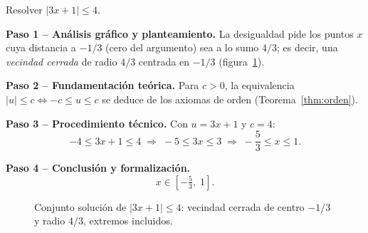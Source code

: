 \begin{example} Resolver $|3x + 1| \leq 4$.

\begin{myproof}
\textbf{Paso 1 – Análisis gráfico y planteamiento.}
La desigualdad pide los puntos $x$ cuya distancia a $-1/3$ (cero del argumento)
sea a lo sumo $4/3$; es decir, una \emph{vecindad cerrada} de radio $4/3$
centrada en $-1/3$ (figura~\ref{fig:valabs_desigualdad}).

\textbf{Paso 2 – Fundamentación teórica.}
Para $c > 0$, la equivalencia $|u| \leq c \iff -c \leq u \leq c$ se deduce
de los axiomas de orden (Teorema~\ref{thm:orden}).

\textbf{Paso 3 – Procedimiento técnico.}
Con $u = 3x+1$ y $c = 4$:
\[
   -4 \leq 3x + 1 \leq 4
   \;\Rightarrow\;
   -5 \leq 3x \leq 3
   \;\Rightarrow\;
   -\frac{5}{3} \leq x \leq 1.
\]

\textbf{Paso 4 – Conclusión y formalización.}
\[
   \boxed{x \in \left[-\tfrac{5}{3},\;1\right].}
\]

\begin{figure}[H]
\centering
{}
\caption{Conjunto solución de $|3x+1|\leq 4$: vecindad cerrada de centro
$-1/3$ y radio $4/3$, extremos incluidos.}
\label{fig:valabs_desigualdad}
\end{figure}
\end{myproof}
\end{example}

